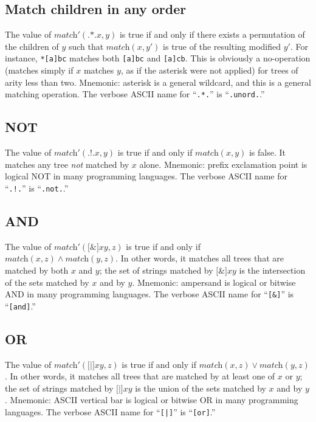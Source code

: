 \documentclass[twocolumn]{report}
\begin{document}
\subsection{Match children in any order}

The value of $\textit{match}'(\texttt{.*.}x,y)$ is true if and only if there
exists a permutation of the children of $y$ such that $\textit{match}(x,y')$
is true of the resulting modified $y'$.  For instance, \texttt{*[a]bc}
matches both \texttt{[a]bc} and \texttt{[a]cb}.  This is obviously a
no-operation (matches simply if $x$ matches $y$, as if the asterisk were not
applied) for trees of arity less than two.  Mnemonic: asterisk is a general
wildcard, and this is a general matching operation.
The verbose ASCII name for ``\texttt{.*.}'' is ``\texttt{.unord.}.''

\subsection{NOT}

The value of $\textit{match}'(\texttt{.!.}x,y)$ is true if and only if
$\textit{match}(x,y)$ is false.  It matches any tree \emph{not} matched by
$x$ alone.  Mnemonic:  prefix exclamation point is logical NOT in many
programming languages.
The verbose ASCII name for ``\texttt{.!.}'' is ``\texttt{.not.}.''

\subsection{AND}

The value of $\textit{match}'(\texttt{[\&]}xy,z)$ is true if and only if
$\textit{match}(x,z) \wedge \textit{match}(y,z)$.  In other words, it
matches all trees that are matched by both $x$ and $y$; the set of strings
matched by $\texttt{[\&]}xy$ is the intersection of the sets matched by $x$
and by $y$.  Mnemonic: ampersand is logical or bitwise AND in many
programming languages.
The verbose ASCII name for ``\texttt{[\&]}'' is ``\texttt{[and]}.''

\subsection{OR}

The value of $\textit{match}'(\texttt{[|]}xy,z)$ is true if and only if
$\textit{match}(x,z) \vee \textit{match}(y,z)$.  In other words, it matches
all trees that are matched by at least one of $x$ or $y$; the set of strings
matched by $\texttt{[|]}xy$ is the union of the sets matched by $x$ and by
$y$.  Mnemonic: ASCII vertical bar is logical or bitwise OR in many
programming languages.
The verbose ASCII name for ``\texttt{[|]}'' is ``\texttt{[or]}.''
\end{document}
